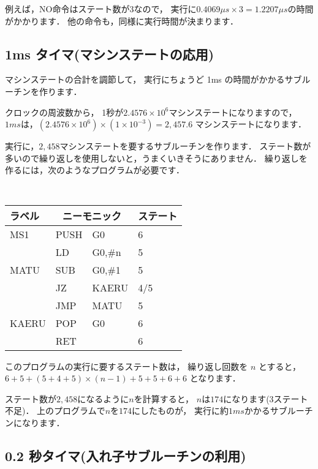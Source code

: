 例えば，NO命令はステート数が3なので，
実行に$0.4069 \mu s \times 3 = 1.2207 \mu s$の時間がかかります．
他の命令も，同様に実行時間が決まります．

\subsection{1ms タイマ(マシンステートの応用)}
\label{ms}

マシンステートの合計を調節して，
実行にちょうど 1ms の時間がかかるサブルーチンを作ります．

クロックの周波数から，
1秒が$2.4576 \times 10^{6}$マシンステートになりますので，
$1ms$は，$(2.4576 \times 10^{6}) \times (1 \times 10^{-3}) = 2,457.6$
マシンステートになります．

実行に，$2,458$マシンステートを要するサブルーチンを作ります．
ステート数が多いので繰り返しを使用しないと，うまくいきそうにありません．
繰り返しを作るには，次のようなプログラムが必要です．

\begin{center}
{\footnotesize\tt
\begin{tabular}{|l|l l|l|} \hline
ラベル & \multicolumn{2}{|c|}{ニーモニック}& ステート \\
\hline
MS1   & PUSH & G0            & 6   \\
      & LD   & G0,\#n        & 5   \\
MATU  & SUB  & G0,\#1        & 5   \\
      & JZ   & KAERU         & 4/5 \\
      & JMP  & MATU          & 5   \\
KAERU & POP  & G0            & 6   \\
      & RET  &               & 6   \\
\hline
\end{tabular}
}
\end{center}

このプログラムの実行に要するステート数は，
繰り返し回数を $n$ とすると，
$ 6 + 5 + ( 5 + 4 + 5 ) \times (n - 1) + 5 + 5 + 6 + 6$
となります．

ステート数が$2,458$になるように$n$を計算すると，
$n$は$174$になります(3ステート不足)．
上のプログラムで$n$を$174$にしたものが，
実行に約$1ms$かかるサブルーチンになります．

\subsection{0.2 秒タイマ(入れ子サブルーチンの利用)}
\label{ms200}

